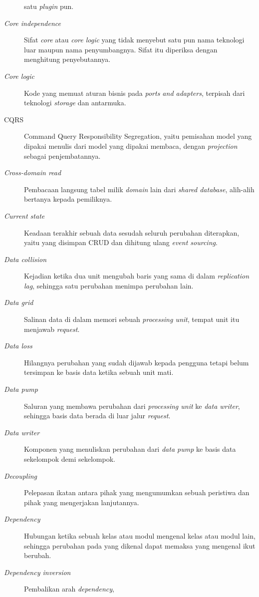 \begin{description}
    satu \textit{plugin} pun.
  \item[\textit{Core independence}] Sifat \textit{core} atau \textit{core logic}
    yang tidak menyebut satu pun nama teknologi luar maupun nama penyumbangnya.
    Sifat itu diperiksa dengan menghitung penyebutannya.
  \item[\textit{Core logic}] Kode yang memuat aturan bisnis pada \textit{ports
    and adapters}, terpisah dari teknologi \textit{storage} dan antarmuka.
  \item[CQRS] Command Query Responsibility Segregation, yaitu pemisahan model
    yang dipakai menulis dari model yang dipakai membaca, dengan
    \textit{projection} sebagai penjembatannya.
  \item[\textit{Cross-domain read}] Pembacaan langsung tabel milik \textit{domain} lain dari
    \textit{shared database}, alih-alih bertanya kepada pemiliknya.
  \item[\textit{Current state}] Keadaan terakhir sebuah data sesudah seluruh
    perubahan diterapkan, yaitu yang disimpan CRUD dan dihitung ulang
    \textit{event sourcing}.
  \item[\textit{Data collision}] Kejadian ketika dua unit mengubah baris yang
    sama di dalam \textit{replication lag}, sehingga satu perubahan menimpa
    perubahan lain.
  \item[\textit{Data grid}] Salinan data di dalam memori sebuah
    \textit{processing unit}, tempat unit itu menjawab \textit{request}.
  \item[\textit{Data loss}] Hilangnya perubahan yang sudah dijawab kepada
    pengguna tetapi belum tersimpan ke basis data ketika sebuah unit mati.
  \item[\textit{Data pump}] Saluran yang membawa perubahan dari
    \textit{processing unit} ke \textit{data writer}, sehingga basis data berada
    di luar jalur \textit{request}.
  \item[\textit{Data writer}] Komponen yang menuliskan perubahan dari
    \textit{data pump} ke basis data sekelompok demi sekelompok.
  \item[\textit{Decoupling}] Pelepasan ikatan antara pihak yang mengumumkan
    sebuah peristiwa dan pihak yang mengerjakan lanjutannya.
  \item[\textit{Dependency}] Hubungan ketika sebuah kelas atau modul mengenal
    kelas atau modul lain, sehingga perubahan pada yang dikenal dapat memaksa
    yang mengenal ikut berubah.
  \item[\textit{Dependency inversion}] Pembalikan arah \textit{dependency},

\end{description}
